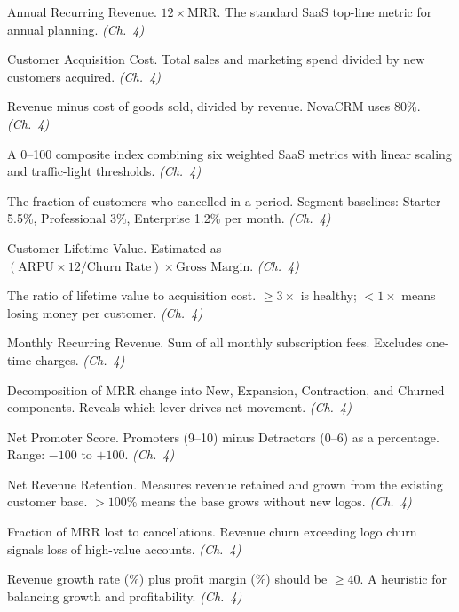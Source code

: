 \begin{description}[style=nextline, leftmargin=2em]

\item[\textbf{ARR}] Annual Recurring Revenue. $12 \times \text{MRR}$. The standard SaaS top-line metric for annual planning. \textit{(Ch.~4)}

\item[\textbf{CAC}] Customer Acquisition Cost. Total sales and marketing spend divided by new customers acquired. \textit{(Ch.~4)}

\item[\textbf{Gross Margin}] Revenue minus cost of goods sold, divided by revenue. NovaCRM uses 80\%. \textit{(Ch.~4)}

\item[\textbf{Health Score}] A 0--100 composite index combining six weighted SaaS metrics with linear scaling and traffic-light thresholds. \textit{(Ch.~4)}

\item[\textbf{Logo Churn}] The fraction of customers who cancelled in a period. Segment baselines: Starter 5.5\%, Professional 3\%, Enterprise 1.2\% per month. \textit{(Ch.~4)}

\item[\textbf{LTV}] Customer Lifetime Value. Estimated as $(\text{ARPU} \times 12 / \text{Churn Rate}) \times \text{Gross Margin}$. \textit{(Ch.~4)}

\item[\textbf{LTV:CAC Ratio}] The ratio of lifetime value to acquisition cost. $\geq 3\times$ is healthy; $< 1\times$ means losing money per customer. \textit{(Ch.~4)}

\item[\textbf{MRR}] Monthly Recurring Revenue. Sum of all monthly subscription fees. Excludes one-time charges. \textit{(Ch.~4)}

\item[\textbf{MRR Waterfall}] Decomposition of MRR change into New, Expansion, Contraction, and Churned components. Reveals which lever drives net movement. \textit{(Ch.~4)}

\item[\textbf{NPS}] Net Promoter Score. Promoters (9--10) minus Detractors (0--6) as a percentage. Range: $-100$ to $+100$. \textit{(Ch.~4)}

\item[\textbf{NRR}] Net Revenue Retention. Measures revenue retained and grown from the existing customer base. $> 100\%$ means the base grows without new logos. \textit{(Ch.~4)}

\item[\textbf{Revenue Churn}] Fraction of MRR lost to cancellations. Revenue churn exceeding logo churn signals loss of high-value accounts. \textit{(Ch.~4)}

\item[\textbf{Rule of 40}] Revenue growth rate (\%) plus profit margin (\%) should be $\geq 40$. A heuristic for balancing growth and profitability. \textit{(Ch.~4)}

\end{description}

